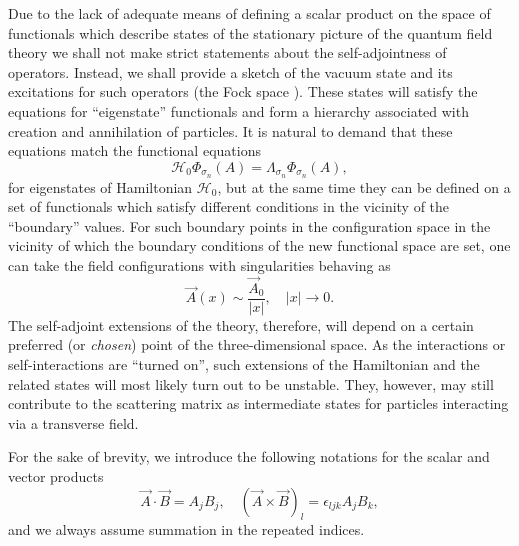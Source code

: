 \documentclass[12pt]{article}
\newcommand{\HH}{\mathscr{H}}
\begin{document}
	Due to the lack of adequate means of defining a scalar product on the space of functionals
	which describe states of the stationary picture of the quantum field theory
	we shall not make strict statements about the self-adjointness of operators.
	Instead, we shall provide a sketch of the vacuum state and its excitations for such operators (the Fock space
\cite{Fock}).
	These states will satisfy the equations for ``eigenstate'' functionals and
	form a hierarchy associated with creation and annihilation of particles.
	It is natural to demand that these equations match
	the functional equations
\begin{equation*}
    \HH_{0} \Phi_{\sigma_{n}}(A) = \Lambda_{\sigma_{n}} \Phi_{\sigma_{n}}(A) ,
\end{equation*}
	for eigenstates of Hamiltonian
$ \HH_{0} $,
	but at the same time they can be defined on a set of functionals
	which satisfy different conditions in the vicinity of the ``boundary'' values.
	For such boundary points in the configuration space
	in the vicinity of which the boundary conditions of the new functional space are set,
	one can take the field configurations with singularities behaving as
\begin{equation}
\label{Asing}
    \vec{A}(x) \sim \frac{\vec{A}_{0}}{|x|}, \quad |x| \to 0.
\end{equation}
	The self-adjoint extensions of the theory, therefore, will depend on a
	certain preferred (or {\it chosen})  point of the three-dimensional space.
	As the interactions or self-interactions are ``turned on'',
	such extensions of the Hamiltonian and the related states will most likely
	turn out to be unstable.
	They, however, may still contribute to the scattering matrix as
	intermediate states for particles interacting via a transverse field.

	For the sake of brevity, we introduce the following notations for the
	scalar and vector products
\begin{equation*}
    \vec{A}\cdot\vec{B} = A_{j}B_{j} ,\quad
	(\vec{A}\times\vec{B})_{l} = \epsilon_{ljk} A_{j} B_{k} ,
\end{equation*}
	and we always assume summation in the repeated indices.




\end{document}
